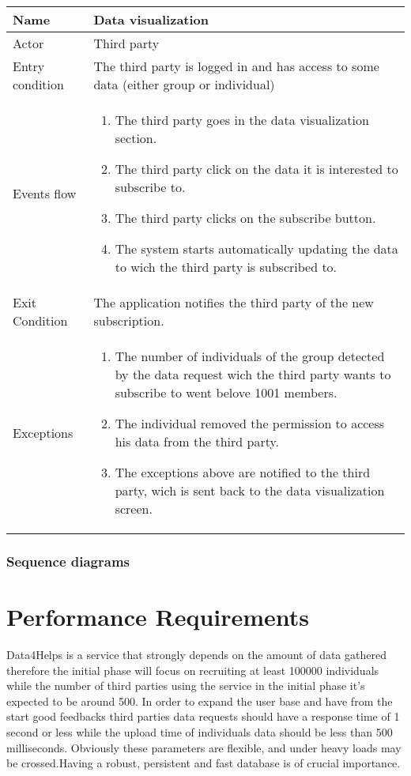    
\begin{tabular}{|l|p{13cm}|}
    \hline
    Name & Data visualization
    \\ \hline
    Actor & Third party
    \\ \hline 
    Entry condition & The third party is logged in and has access to some data (either group or individual)
        \\ \hline
    Events flow &
    \begin{enumerate}
    \item The third party goes in the data visualization section.
    \item The third party click on the data it is interested to subscribe to.
	\item The third party clicks on the subscribe button.
	\item The system starts automatically updating the data to wich the third party is subscribed to.
    \end{enumerate}
     \\ \hline
     Exit Condition & The application notifies the third party of the new subscription.
     \\
    \hline
    Exceptions &
        \begin{enumerate}
    \item The number of individuals of the group detected by the data request wich the third party wants to subscribe to went belove 1001 members.
    \item The individual removed the permission to access his data from the third party.
        \item The exceptions above are notified to the third party, wich is sent back to the data visualization screen.
    \end{enumerate}   
  \\
    \hline
\end{tabular}







\subsubsection{Sequence diagrams}

\section{Performance Requirements}
Data4Helps is a service that strongly depends on the amount of data gathered therefore the initial phase will focus on recruiting at least 100000 individuals while the number of third parties using the service in the initial phase it's expected to be around 500. In order to expand the user base and have from the start good feedbacks third parties data requests should have a response time of 1 second or less while the upload time of individuals data should be less than 500 milliseconds. Obviously these parameters are flexible, and under heavy loads may be crossed.Having a robust, persistent and fast database is of crucial importance.

